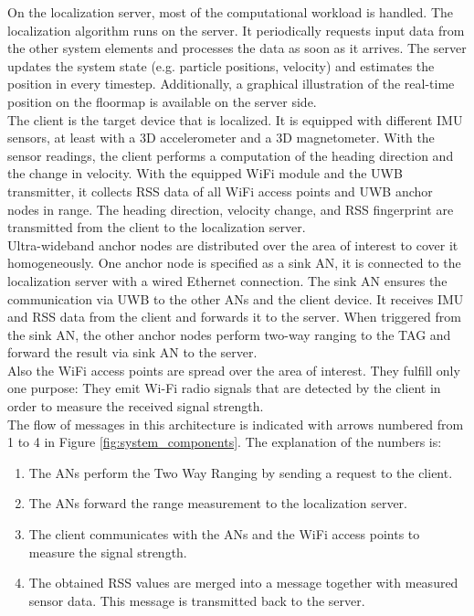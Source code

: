 \noindent\hspace*{5mm}%
On the localization server, most of the computational workload is handled. The localization algorithm runs on the server. It periodically requests input data from the other system elements and processes the data as soon as it arrives. The server updates the system state (e.g. particle positions, velocity) and estimates the position in every timestep. Additionally, a graphical illustration of the real-time position on the floormap is available on the server side. \\
\noindent\hspace*{5mm}%
The client is the target device that is localized. It is equipped with different IMU sensors, at least with a 3D accelerometer and a 3D magnetometer. With the sensor readings, the client performs a computation of the heading direction and the change in velocity. With the equipped WiFi module and the UWB transmitter, it collects RSS data of all WiFi access points and UWB anchor nodes in range. The heading direction, velocity change, and RSS fingerprint are transmitted from the client to the localization server.\\
\noindent\hspace*{5mm}%
Ultra-wideband anchor nodes are distributed over the area of interest to cover it homogeneously. One anchor node is specified as a sink AN, it is connected to the localization server with a wired Ethernet connection. The sink AN ensures the communication via UWB to the other ANs and the client device. It receives IMU and RSS data from the client and forwards it to the server. When triggered from the sink AN, the other anchor nodes perform two-way ranging to the TAG and forward the result via sink AN to the server.\\
\noindent\hspace*{5mm}%
Also the WiFi access points are spread over the area of interest. They fulfill only one purpose: They emit Wi-Fi radio signals that are detected by the client in order to measure the received signal strength.\\
\noindent\hspace*{5mm}%
The flow of messages in this architecture is indicated with arrows numbered from 1 to 4 in Figure \ref{fig:system_components}. The explanation of the numbers is:\\
\begin{enumerate}
\item The ANs perform the Two Way Ranging by sending a request to the client. 
\item The ANs forward the range measurement to the localization server.
\item The client communicates with the ANs and the WiFi access points to measure the signal strength.
\item The obtained RSS values are merged into a message together with measured sensor data. This message is transmitted back to the server.
\end{enumerate}


